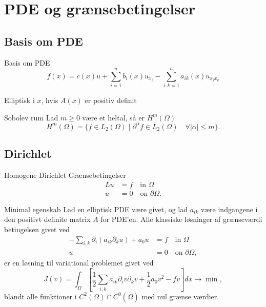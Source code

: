 
\section{PDE og grænsebetingelser}
\subsection{Basis om PDE}
\begin{frame}{Basis om PDE}{}
    \begin{equation*}
        f(x) = c(x) u + \sum_{i=1}^{n}b_i(x)u_{x_{i}}
       - \sum_{i,k=1}^{n}a_{ik}(x)u_{x_i x_k}
   \end{equation*}    

   Elliptisk i $x$, hvis $A(x)$ er positiv definit
\end{frame}

\begin{frame}{Sobolev rum}{}
    Lad $m \geq 0$ være et heltal, så er $H^m(\Omega)$
    \begin{equation*}
        H^m(\Omega) = \{  f \in L_2(\Omega) \mid \partial ^{\alpha}f \in 
        L_2(\Omega) \quad \forall |\alpha| \leq m  \}.
    \end{equation*}
\end{frame}

\subsection{Dirichlet}
\begin{frame}{Homogene Dirichlet Grænsebetingelser}{}
    \begin{align*}
        Lu &= f \quad \text{in } \Omega\\
        u &= 0 \quad \text{on } \partial \Omega.
    \end{align*}
\end{frame}

\begin{frame}{Minimal egenskab}{}
    Lad en elliptisk PDE være givet, og lad $a_{ik}$ være indgangene i den positivt definite matrix $A$ for PDE'en.
    Alle klassiske løsninger af grænseværdi betingelsen givet ved
    \begin{align}
        -\sum_{i,k} \partial_i (a_{ik}\partial_k u) + a_0 u &= f \quad \text{in } \Omega  \\
        u &= 0 \quad \text{on } \partial \Omega,
    \end{align}
        er en løsning til variational problemet givet ved
        \[
            J(v)=\int_\Omega \left [\frac{1}{2}\sum_{i,k} a_{ik} \partial_i v\partial_k v + \frac{1}{2} a_0 v^2 -fv\right ]dx \longrightarrow \min,
        \]
        blandt alle funktioner i $C^2(\Omega)\cap C^0(\bar{\Omega})$ med nul grænse værdier.
\end{frame}



